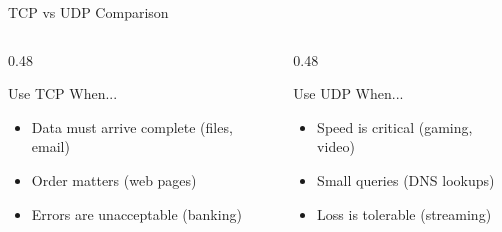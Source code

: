 \documentclass[aspectratio=169]{beamer}  %
\begin{document}
\begin{frame}{TCP vs UDP Comparison}
    \vspace{0.3em}
    \begin{columns}[T]
        \begin{column}{0.48\textwidth}
            \begin{block}{Use TCP When...}
                \small
                \begin{itemize}\setlength{\itemsep}{1pt}
                    \item Data must arrive complete (files, email)
                    \item Order matters (web pages)
                    \item Errors are unacceptable (banking)
                \end{itemize}
            \end{block}
        \end{column}
        \begin{column}{0.48\textwidth}
            \begin{block}{Use UDP When...}
                \small
                \begin{itemize}\setlength{\itemsep}{1pt}
                    \item Speed is critical (gaming, video)
                    \item Small queries (DNS lookups)
                    \item Loss is tolerable (streaming)
                \end{itemize}
            \end{block}
        \end{column}
    \end{columns}
\end{frame}
\end{document}
